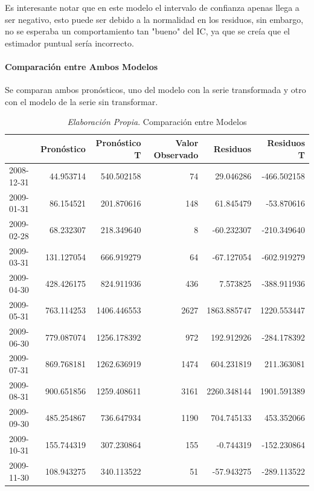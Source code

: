 \documentclass[12pt,letterpaper]{article}   %
\begin{document}
Es interesante notar que en este modelo el intervalo de confianza apenas llega a ser negativo, esto puede ser debido a la normalidad en los residuos, sin embargo, no se esperaba un comportamiento tan "bueno"  del IC, ya que se creía que el estimador puntual sería incorrecto.

\newpage
  \paragraph{Comparación entre Ambos Modelos}

Se comparan ambos pronósticos, uno del modelo con la serie transformada y otro con el modelo de la serie sin transformar.

\begin{table}[ht]
\footnotesize
\centering
\begin{tabular}{lrrrrr}
\toprule
 & \textbf{Pronóstico} & \textbf{Pronóstico T} & \textbf{Valor Observado} & \textbf{Residuos} & \textbf{Residuos T} \\
\midrule
2008-12-31 & 44.953714 & 540.502158 & 74 & 29.046286 & -466.502158 \\
2009-01-31 & 86.154521 & 201.870616 & 148 & 61.845479 & -53.870616 \\
2009-02-28 & 68.232307 & 218.349640 & 8 & -60.232307 & -210.349640 \\
2009-03-31 & 131.127054 & 666.919279 & 64 & -67.127054 & -602.919279 \\
2009-04-30 & 428.426175 & 824.911936 & 436 & 7.573825 & -388.911936 \\
2009-05-31 & 763.114253 & 1406.446553 & 2627 & 1863.885747 & 1220.553447 \\
2009-06-30 & 779.087074 & 1256.178392 & 972 & 192.912926 & -284.178392 \\
2009-07-31 & 869.768181 & 1262.636919 & 1474 & 604.231819 & 211.363081 \\
2009-08-31 & 900.651856 & 1259.408611 & 3161 & 2260.348144 & 1901.591389 \\
2009-09-30 & 485.254867 & 736.647934 & 1190 & 704.745133 & 453.352066 \\
2009-10-31 & 155.744319 & 307.230864 & 155 & -0.744319 & -152.230864 \\
2009-11-30 & 108.943275 & 340.113522 & 51 & -57.943275 & -289.113522 \\
\bottomrule
\end{tabular}
\caption{\textit{Elaboración Propia}. Comparación entre Modelos}
\end{table}
\end{document}
